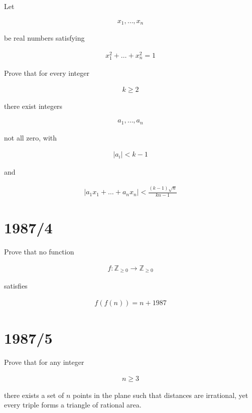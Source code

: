 \documentclass[12pt]{article}
\begin{document}
Let

\begin{align*}
x_1,\dots,x_n
\end{align*}

be real numbers satisfying

\begin{align*}
x_1^2+\dots+x_n^2=1
\end{align*}

Prove that for every integer

\begin{align*}
k\geq2
\end{align*}

there exist integers

\begin{align*}
a_1,\dots,a_n
\end{align*}

not all zero, with

\begin{align*}
|a_i|<k-1
\end{align*}

and

\begin{align*}
|a_1x_1+\dots+a_nx_n|
<
\frac{(k-1)\sqrt{n}}{kn-1}
\end{align*}

\section*{1987/4}

Prove that no function

\begin{align*}
f:\mathbb{Z}_{\geq0}\to\mathbb{Z}_{\geq0}
\end{align*}

satisfies

\begin{align*}
f(f(n))=n+1987
\end{align*}

\section*{1987/5}

Prove that for any integer

\begin{align*}
n\geq3
\end{align*}

there exists a set of $n$ points in the plane such that distances are irrational, yet every triple forms a triangle of rational area.
\end{document}
